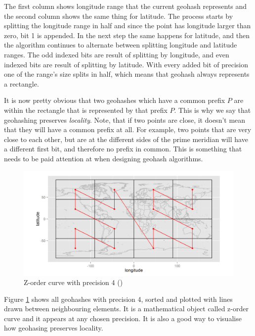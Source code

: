 \documentclass[times, utf8, diplomski]{fer}
\begin{document}
The first column shows longitude range that the current geohash represents and the second column shows the same thing for latitude. The process starts by splitting the longitude range in half and since the point has longitude larger than zero, bit 1 is appended. In the next step the same happens for latitude, and then the algorithm continues to alternate between splitting longitude and latitude ranges. The odd indexed bits are result of splitting by longitude, and even indexed bits are result of splitting by latitude. With every added bit of precision one of the range's size splits in half, which means that geohash always represents a rectangle.

It is now pretty obvious that two geohashes which have a common prefix $P$ are within the rectangle that is represented by that prefix $P$. This is why we say that geohashing preserves \emph{locality}. Note, that if two points are close, it doesn't mean that they will have a common prefix at all. For example, two points that are very close to each other, but are at the different sides of the prime meridian will have a different first bit, and therefore no prefix in common. This is something that needs to be paid attention at when designing geohash algorithms.

\begin{figure}[h]
\includegraphics[width=\textwidth]{z_curve}
\caption{Z-order curve with precision 4 (\citet {spatiotemporal})}
\label{fig:zcurve}
\end{figure}

Figure \ref{fig:zcurve} shows all geohashes with precision 4, sorted and plotted with lines drawn between neighbouring elements. It is a mathematical object called z-order curve \cite{zcurve} and it appears at any chosen precision. It is also a good way to visualise how geohasing preserves locality.
\end{document}
